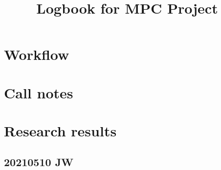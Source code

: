 \documentclass{report}
\title{Logbook for MPC Project}
\date{}
\numberwithin{equation}{section}
\numberwithin{figure}{section}
\numberwithin{table}{section}
\begin{document}
\maketitle

\renewcommand{\thechapter}{\Alph{chapter}}
\setcounter{tocdepth}{1}
\tableofcontents
\etocsettocstyle{}{} %

\chapter{Workflow} 







\chapter{Call notes} 



\chapter{Research results}

%

\section{20210510 JW} 
%
%
\end{document}
